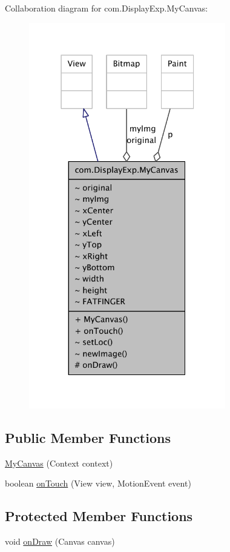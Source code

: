 Collaboration diagram for com.\-Display\-Exp.\-My\-Canvas\-:
\nopagebreak
\begin{figure}[H]
\begin{center}
\leavevmode
\includegraphics[width=243pt]{classcom_1_1_display_exp_1_1_my_canvas__coll__graph}
\end{center}
\end{figure}
\subsection*{Public Member Functions}
\begin{DoxyCompactItemize}
\item 
\hyperlink{classcom_1_1_display_exp_1_1_my_canvas_ac0d0abb985ebb2548ff43e8b53245f0e}{My\-Canvas} (Context context)
\item 
boolean \hyperlink{classcom_1_1_display_exp_1_1_my_canvas_a894833c69a49d5a11ceb286ad750a032}{on\-Touch} (View view, Motion\-Event event)
\end{DoxyCompactItemize}
\subsection*{Protected Member Functions}
\begin{DoxyCompactItemize}
\item 
void \hyperlink{classcom_1_1_display_exp_1_1_my_canvas_a67b5fa8a6def1b3b8c6b0b61859e0434}{on\-Draw} (Canvas canvas)
\end{DoxyCompactItemize}


